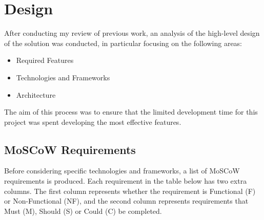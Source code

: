 \chapter{Design}
After conducting my review of previous work, an analysis of the high-level design of the solution was conducted, in particular focusing on the following areas:
\begin{itemize}
	\item Required Features
	\item Technologies and Frameworks
	\item Architecture
\end{itemize}

The aim of this process was to ensure that the limited development time for this project was spent developing the most effective features.

\section{MoSCoW Requirements}

Before considering specific technologies and frameworks, a list of MoSCoW requirements is produced. Each requirement in the table below has two extra columns. The first column represents whether the requirement is Functional (F) or Non-Functional (NF), and the second column represents requirements that Must (M), Should (S) or Could (C) be completed.

